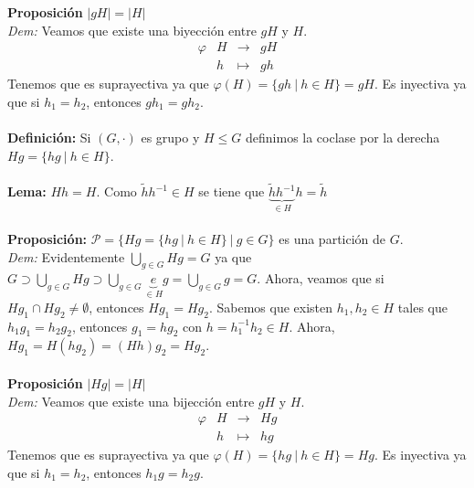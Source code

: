 \documentclass{article}
\begin{document}

\textbf{Proposición} $|gH|=|H|$\\
\textit{Dem:} Veamos que existe una biyección entre $gH$ y $H$.
$$
\begin{array}{lllll}
    \varphi & H & \longrightarrow & gH \\
         & h & \longmapsto     & gh
\end{array}
$$
Tenemos que es suprayectiva ya que $\varphi(H)=\{gh\:|\:h\in H\}=gH$. Es inyectiva ya que si $h_1=h_2$, entonces $gh_1=gh_2$.\\\\


\textbf{Definición:} Si $(G,\cdot)$ es grupo y $H\le G$ definimos la coclase por la derecha $Hg=\{hg\:|\:h\in H\}$.\\\\


\textbf{Lema:} $Hh=H$. Como $\tilde{h}h^{-1}\in H$ se tiene que $\underbrace{\tilde{h}h^{-1}}_{\in H}h=\tilde{h}$\\\\


\textbf{Proposición:} $\mathcal{P}=\{Hg=\{hg\:|\:h\in H\}\:|\:g\in G\}$ es una partición de $G$.\\
\textit{Dem:} Evidentemente $\displaystyle\bigcup_{g\in G} Hg = G$ ya que $G\supset\displaystyle\bigcup_{g\in G} Hg \supset\displaystyle\bigcup_{g\in G} \underbrace{e}_{\in H}g=\displaystyle\bigcup_{g\in G} g = G$. Ahora, veamos que si $Hg_1\cap Hg_2\ne\emptyset$, entonces $Hg_1=Hg_2$. Sabemos que existen $h_1,h_2 \in H$ tales que $h_1g_1=h_2g_2$, entonces $g_1=hg_2$ con $h=h_1^{-1}h_2\in H$. Ahora, $Hg_1=H(hg_2)=(Hh)g_2=Hg_2$.\\\\


\textbf{Proposición} $|Hg|=|H|$\\
\textit{Dem:} Veamos que existe una bijección entre $gH$ y $H$.
$$
\begin{array}{lllll}
    \varphi & H & \longrightarrow & Hg \\
         & h & \longmapsto     & hg
\end{array}
$$
Tenemos que es suprayectiva ya que $\varphi(H)=\{hg\:|\:h\in H\}=Hg$. Es inyectiva ya que si $h_1=h_2$, entonces $h_1g=h_2g$.\\\\
\end{document}

